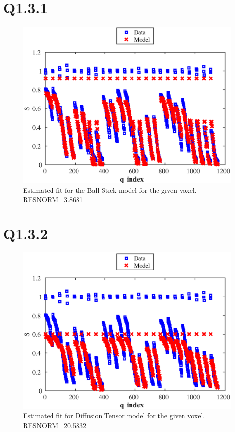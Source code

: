 \documentclass[11pt,a4paper,oneside]{report}
\begin{document}
\section*{Q1.3.1}

\begin{figure}[H]
\centering
\includegraphics[scale=0.8]{figures/q3/q131.eps}
\caption{Estimated fit for the Ball-Stick model for the given voxel. RESNORM=3.8681}
\label{q131}
\end{figure}

\section*{Q1.3.2}

\begin{figure}[H]
\centering
\includegraphics[scale=0.8]{figures/q3/q132-DiffTensor.eps}
\caption{Estimated fit for Diffusion Tensor model for the given voxel. RESNORM=20.5832}
\label{q132-DiffTensor}
\end{figure}
\end{document}
